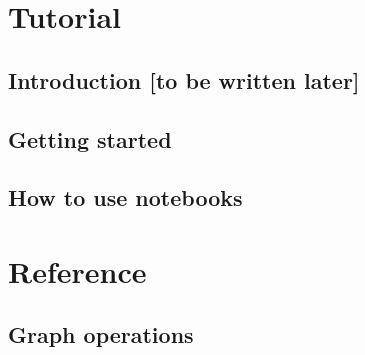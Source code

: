 


\makeindex[intoc]






\hypertarget{contents}{}
\tableofcontents

\mainmatter
{}

\part{Tutorial}

\cleardoublepage
{}

\chapter*{Introduction [to be written later]}
\FILL

\chapter{Getting started}


\chapter{How to use notebooks}


\part{Reference}


\chapter{Graph operations}


